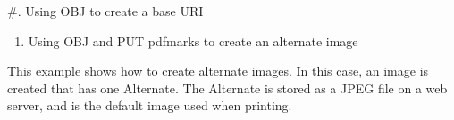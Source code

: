 \documentclass[letterpaper,12pt,english,openany,oneside]{sphinxmanual}
\begin{document}
\#. Using OBJ to create a base URI

\begin{sphinxVerbatim}[commandchars=\\\{\}]
    
\PYG{p}{[}      
           
\PYG{p}{[}         
       
\PYG{p}{[}         
\end{sphinxVerbatim}
\begin{enumerate}
%
\item {} 
Using OBJ and PUT pdfmarks to create an alternate image

\end{enumerate}

This example shows how to create alternate images. In this case, an image is created that has one Alternate. The Alternate is stored as a JPEG file on a web server, and is the default image used when printing.
\end{document}

